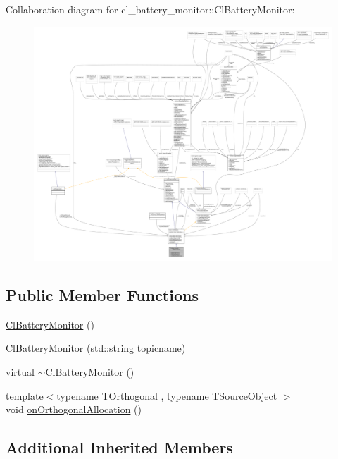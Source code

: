 Collaboration diagram for cl\+\_\+battery\+\_\+monitor\+:\+:Cl\+Battery\+Monitor\+:
\nopagebreak
\begin{figure}[H]
\begin{center}
\leavevmode
\includegraphics[width=350pt]{classcl__battery__monitor_1_1ClBatteryMonitor__coll__graph}
\end{center}
\end{figure}
\subsection*{Public Member Functions}
\begin{DoxyCompactItemize}
\item 
\hyperlink{classcl__battery__monitor_1_1ClBatteryMonitor_a31aa11369ec7327826ae0f7de3737a8c}{Cl\+Battery\+Monitor} ()
\item 
\hyperlink{classcl__battery__monitor_1_1ClBatteryMonitor_a71e2ced477a9d420691e000cf03a2e8e}{Cl\+Battery\+Monitor} (std\+::string topicname)
\item 
virtual \hyperlink{classcl__battery__monitor_1_1ClBatteryMonitor_a566d5dc4bb04330b4c54ee417e6664b3}{$\sim$\+Cl\+Battery\+Monitor} ()
\item 
{\footnotesize template$<$typename T\+Orthogonal , typename T\+Source\+Object $>$ }\\void \hyperlink{classcl__battery__monitor_1_1ClBatteryMonitor_a52e5b82937435bfdab0c774fae599966}{on\+Orthogonal\+Allocation} ()
\end{DoxyCompactItemize}
\subsection*{Additional Inherited Members}


